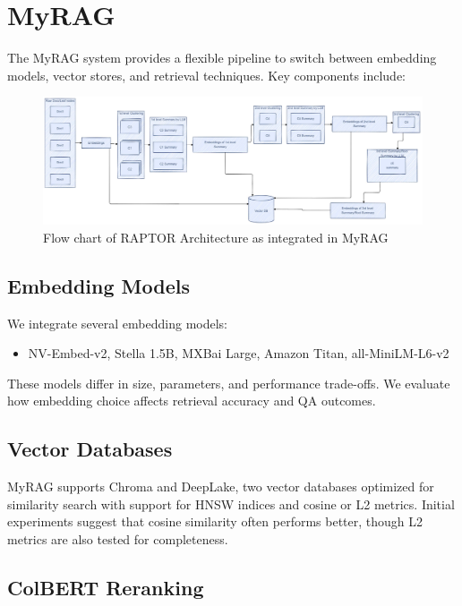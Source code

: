 \documentclass{scrartcl}
\begin{document}
\section{MyRAG}

The MyRAG system provides a flexible pipeline to switch between embedding models, vector stores, and retrieval techniques. Key components include:

\begin{figure}[h]
	\centering
	\includegraphics[width=\linewidth]{Raptor.pdf}
	\caption{Flow chart of RAPTOR Architecture as integrated in MyRAG}
	\label{fig:raptor}
\end{figure}

\subsection{Embedding Models}

We integrate several embedding models:
\begin{itemize}
    \item NV-Embed-v2, Stella 1.5B, MXBai Large, Amazon Titan, all-MiniLM-L6-v2
\end{itemize}
These models differ in size, parameters, and performance trade-offs. We evaluate how embedding choice affects retrieval accuracy and QA outcomes.

\subsection{Vector Databases}

MyRAG supports Chroma and DeepLake, two vector databases optimized for similarity search with support for HNSW indices and cosine or L2 metrics. Initial experiments suggest that cosine similarity often performs better, though L2 metrics are also tested for completeness.

\subsection{ColBERT Reranking}
\end{document}
